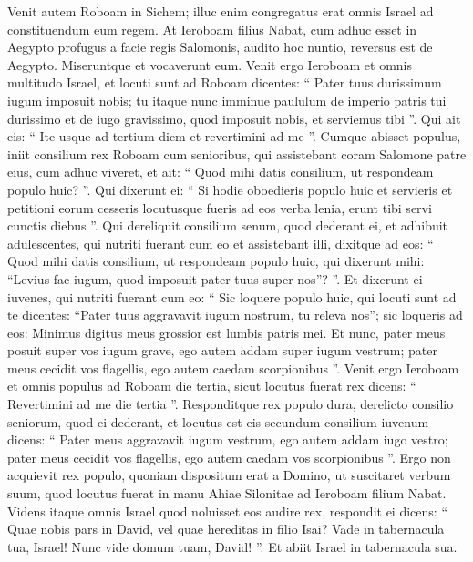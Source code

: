 \begin{biblechapter}
\begin{biblechapter}
\begin{biblechapter}
\begin{biblechapter}
\begin{biblechapter}
\begin{biblechapter}
\begin{biblechapter}
\begin{biblechapter}
\begin{biblechapter}
\begin{biblechapter}
\begin{biblechapter}
\begin{biblechapter}
\verse Venit autem Roboam in Sichem; illuc enim congregatus erat omnis Israel ad constituendum eum regem. 
\verse At Ieroboam filius Nabat, cum adhuc esset in Aegypto profugus a facie regis Salomonis, audito hoc nuntio, reversus est de Aegypto. 
\verse Miseruntque et vocaverunt eum. Venit ergo Ieroboam et omnis multitudo Israel, et locuti sunt ad Roboam dicentes: 
\verse “ Pater tuus durissimum iugum imposuit nobis; tu itaque nunc imminue paululum de imperio patris tui durissimo et de iugo gravissimo, quod imposuit nobis, et serviemus tibi ”. 
\verse Qui ait eis: “ Ite usque ad tertium diem et revertimini ad me ”.
 Cumque abisset populus, 
\verse iniit consilium rex Roboam cum senioribus, qui assistebant coram Salomone patre eius, cum adhuc viveret, et ait: “ Quod mihi datis consilium, ut respondeam populo huic? ”. 
\verse Qui dixerunt ei: “ Si hodie oboedieris populo huic et servieris et petitioni eorum cesseris locutusque fueris ad eos verba lenia, erunt tibi servi cunctis diebus ”. 
\verse Qui dereliquit consilium senum, quod dederant ei, et adhibuit adulescentes, qui nutriti fuerant cum eo et assistebant illi, 
\verse dixitque ad eos: “ Quod mihi datis consilium, ut respondeam populo huic, qui dixerunt mihi: “Levius fac iugum, quod imposuit pater tuus super nos”? ”. 
\verse Et dixerunt ei iuvenes, qui nutriti fuerant cum eo: “ Sic loquere populo huic, qui locuti sunt ad te dicentes: “Pater tuus aggravavit iugum nostrum, tu releva nos”; sic loqueris ad eos: Minimus digitus meus grossior est lumbis patris mei. 
\verse Et nunc, pater meus posuit super vos iugum grave, ego autem addam super iugum vestrum; pater meus cecidit vos flagellis, ego autem caedam scorpionibus ”.
 \verse Venit ergo Ieroboam et omnis populus ad Roboam die tertia, sicut locutus fuerat rex dicens: “ Revertimini ad me die tertia ”. 
\verse Responditque rex populo dura, derelicto consilio seniorum, quod ei dederant, 
\verse et locutus est eis secundum consilium iuvenum dicens:
 “ Pater meus aggravavit iugum vestrum,
 ego autem addam iugo vestro;
 pater meus cecidit vos flagellis,
 ego autem caedam vos scorpionibus ”.
 \verse Ergo non acquievit rex populo, quoniam dispositum erat a Domino, ut suscitaret verbum suum, quod locutus fuerat in manu Ahiae Silonitae ad Ieroboam filium Nabat.
 \verse Videns itaque omnis Israel quod noluisset eos audire rex, respondit ei dicens:
 “ Quae nobis pars in David,
 vel quae hereditas in filio Isai?
 Vade in tabernacula tua, Israel!
 Nunc vide domum tuam, David! ”. Et abiit Israel in tabernacula sua. 

\end{biblechapter}
\end{biblechapter}
\end{biblechapter}
\end{biblechapter}
\end{biblechapter}
\end{biblechapter}
\end{biblechapter}
\end{biblechapter}
\end{biblechapter}
\end{biblechapter}
\end{biblechapter}
\end{biblechapter}
